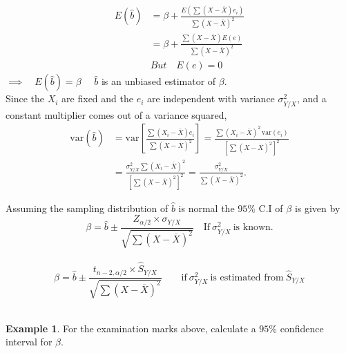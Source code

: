 \documentclass[11pt,a4paper]{article}
\theoremstyle{definition}
\newtheorem{example}[thm]{Example}
\begin{document}
\begin{align*}
E(\hat{b}) &=\beta +\frac{E\left(\sum (X-\overline{X})e_i\right)}{\sum (X-\overline{X})^2}\\[1ex]
&=\beta +\frac{\sum (X-\overline{X})E(e)}{\sum (X-\overline{X})^2}\\[1ex]
& But \quad  E(e)=0
\end{align*}
$\implies\quad  E(\hat{b})=\beta\quad $ $\hat{b}$ is an unbiased estimator of $\beta$.\\
Since the $X_i$ are fixed and the $e_i$ are independent with variance $\sigma^2_{Y/X}$, and a
constant multiplier comes out of a variance squared,
\begin{align*}
\text{var}(\hat{b}) &=\text{var}\left[\frac{\sum (X_i-\overline{X})e_i}{\sum (X-\overline{X})^2}\right]
=\frac{\sum (X_i-\overline{X})^2\,\text{var}(e_i)}{\left[\sum (X-\overline{X})^2\right]^2}\\
&=\frac{\sigma^2_{Y/X}\sum (X_i-\overline{X})^2}{\left[\sum (X-\overline{X})^2\right]^2}
=\frac{\sigma^2_{Y/X}}{\sum (X-\overline{X})^2}.
\end{align*}

Assuming the sampling distribution of $\hat{b}$ is normal the $95\%$ C.I of $\beta$ is given by 
\[\beta =\hat{b}\pm \frac{Z_{\alpha/2}\times \sigma_{Y/X}}{\sqrt{\sum (X-\overline{X})^2}}\quad \text{If}\ \sigma_{Y/X}^2\  \text{is known}.\]\\
\[\beta =\hat{b}\pm \frac{t_{n-2,\alpha/2}\times \hat{S}_{Y/X}}{\sqrt{\sum (X-\overline{X})^2}}\qquad  \text{if}\ \sigma^2_{Y/X}\ \text{is estimated from}\  \hat{S}_{Y/X}\]\\

\begin{example}
For the examination marks above, calculate a $95\%$ confidence interval for $\beta$.
\end{example}
\end{document}
